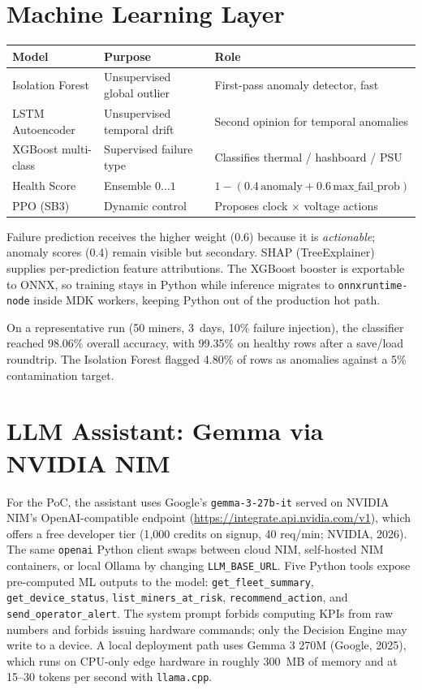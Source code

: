 \documentclass[11pt,a4paper]{article}
\begin{document}
\section{Machine Learning Layer}
\begin{longtable}{p{3.3cm} p{4.3cm} p{6.3cm}}
    \toprule
    \textbf{Model} & \textbf{Purpose} & \textbf{Role} \\
    \midrule
    \endhead
    Isolation Forest      & Unsupervised global outlier & First-pass anomaly detector, fast \\
    LSTM Autoencoder      & Unsupervised temporal drift & Second opinion for temporal anomalies \\
    XGBoost multi-class   & Supervised failure type     & Classifies thermal / hashboard / PSU \\
    Health Score          & Ensemble $0 \dots 1$        & $1 - (0.4\,\text{anomaly} + 0.6\,\text{max\_fail\_prob})$ \\
    PPO (SB3)             & Dynamic control             & Proposes clock $\times$ voltage actions \\
    \bottomrule
\end{longtable}
Failure prediction receives the higher weight (0.6) because it is
\emph{actionable}; anomaly scores (0.4) remain visible but secondary. SHAP
(Tree\-Explainer) supplies per-prediction feature attributions. The XGBoost
booster is exportable to ONNX, so training stays in Python while inference
migrates to \texttt{onnxruntime-node} inside MDK workers, keeping Python out
of the production hot path.

On a representative run (50 miners, 3~days, 10\% failure injection), the
classifier reached 98.06\% overall accuracy, with 99.35\% on healthy rows
after a save/load roundtrip. The Isolation Forest flagged 4.80\% of rows as
anomalies against a 5\% contamination target.

\section{LLM Assistant: Gemma via NVIDIA NIM}
For the PoC, the assistant uses Google's \texttt{gemma-3-27b-it} served on
NVIDIA NIM's OpenAI-compatible endpoint
(\url{https://integrate.api.nvidia.com/v1}), which offers a free developer
tier (1{,}000 credits on signup, 40 req/min; NVIDIA, 2026). The same
\texttt{openai} Python client swaps between cloud NIM, self-hosted NIM
containers, or local Ollama by changing \texttt{LLM\_BASE\_URL}. Five
Python tools expose pre-computed ML outputs to the model:
\texttt{get\_fleet\_summary}, \texttt{get\_device\_status},
\texttt{list\_miners\_at\_risk}, \texttt{recommend\_action}, and
\texttt{send\_operator\_alert}. The system prompt forbids computing KPIs
from raw numbers and forbids issuing hardware commands; only the Decision
Engine may write to a device. A local deployment path uses Gemma 3 270M
(Google, 2025), which runs on CPU-only edge hardware in roughly 300~MB of
memory and at 15--30 tokens per second with \texttt{llama.cpp}.
\end{document}
